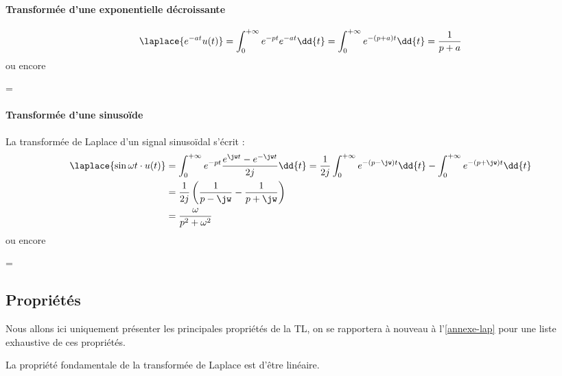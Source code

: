 \paragraph{Transformée d'une exponentielle décroissante}

$$
\laplace{e^{-at}u(t)}=\int_{0}^{+\infty} e^{-pt}e^{-at}\dd{t}=\int_{0}^{+\infty} e^{-(p+a)t}\dd{t} = \dfrac{1}{p+a}
$$
ou encore
\begin{bequation}
    =
\end{bequation}

\paragraph{Transformée d'une sinuso\"ide}
La transformée de Laplace d'un signal sinuso\"idal s'écrit :
\begin{align*}
    \laplace{\sin{\omega t}\cdot u(t)}&=\int_{0}^{+\infty}e^{-pt}\dfrac{e^{\jw t}-e^{-\jw t}}{2j}\dd{t}=\dfrac{1}{2j}\int_{0}^{+\infty}e^{-(p-\jw)t}\dd{t} - \int_{0}^{+\infty}e^{-(p+\jw)t}\dd{t} \\
 &=\dfrac{1}{2j}\left( \dfrac{1}{p-\jw}-\dfrac{1}{p+\jw}\right)\\
 &=\dfrac{\omega}{p^2+\omega^2}
\end{align*}
ou encore
\begin{bequation}
    =
\end{bequation}



\subsection{Propriétés}
Nous allons ici uniquement présenter les principales propriétés de la TL, 
on se rapportera à nouveau à l'\cref{annexe-lap} pour 
une liste exhaustive de ces propriétés.

La propriété fondamentale de la transformée de Laplace est d'être linéaire.

